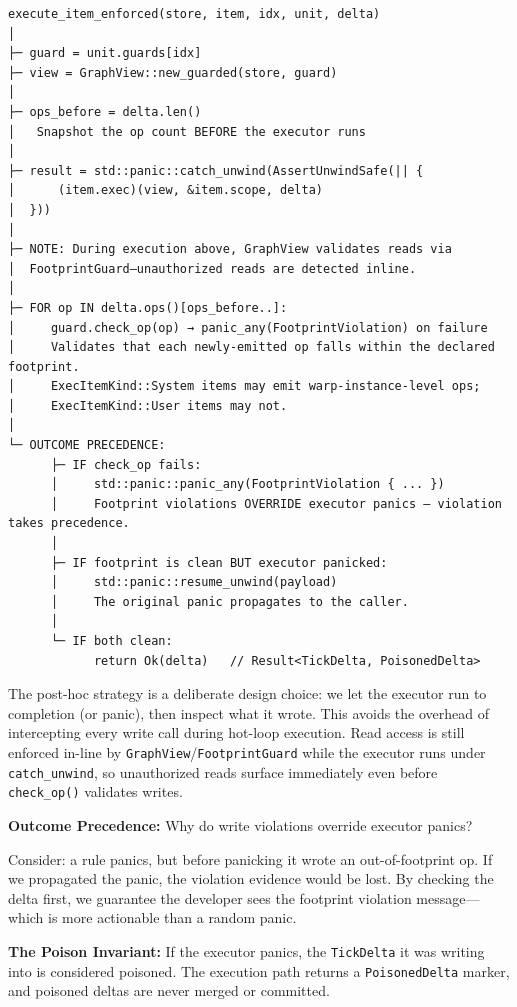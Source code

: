 \documentclass[11pt]{book}
\begin{document}
\begin{verbatim}
execute_item_enforced(store, item, idx, unit, delta)
│
├─ guard = unit.guards[idx]
├─ view = GraphView::new_guarded(store, guard)
│
├─ ops_before = delta.len()
│   Snapshot the op count BEFORE the executor runs
│
├─ result = std::panic::catch_unwind(AssertUnwindSafe(|| {
│      (item.exec)(view, &item.scope, delta)
│  }))
│
├─ NOTE: During execution above, GraphView validates reads via
│  FootprintGuard—unauthorized reads are detected inline.
│
├─ FOR op IN delta.ops()[ops_before..]:
│     guard.check_op(op) → panic_any(FootprintViolation) on failure
│     Validates that each newly-emitted op falls within the declared footprint.
│     ExecItemKind::System items may emit warp-instance-level ops;
│     ExecItemKind::User items may not.
│
└─ OUTCOME PRECEDENCE:
      ├─ IF check_op fails:
      │     std::panic::panic_any(FootprintViolation { ... })
      │     Footprint violations OVERRIDE executor panics — violation takes precedence.
      │
      ├─ IF footprint is clean BUT executor panicked:
      │     std::panic::resume_unwind(payload)
      │     The original panic propagates to the caller.
      │
      └─ IF both clean:
            return Ok(delta)   // Result<TickDelta, PoisonedDelta>
\end{verbatim}

\begin{tourguide}
The post-hoc strategy is a deliberate design choice: we let the executor run to completion (or panic), then inspect what it wrote. This avoids the overhead of intercepting every write call during hot-loop execution. Read access is still enforced in-line by \texttt{GraphView}/\texttt{FootprintGuard} while the executor runs under \texttt{catch\_unwind}, so unauthorized reads surface immediately even before \texttt{check\_op()} validates writes.
\end{tourguide}

\begin{cleverpattern}
\textbf{Outcome Precedence:} Why do write violations override executor panics?

Consider: a rule panics, but before panicking it wrote an out-of-footprint op. If we propagated the panic, the violation evidence would be lost. By checking the delta first, we guarantee the developer sees the footprint violation message—which is more actionable than a random panic.
\end{cleverpattern}

\textbf{The Poison Invariant:} If the executor panics, the \texttt{TickDelta}
it was writing into is considered poisoned. The execution path returns a
\texttt{PoisonedDelta} marker, and poisoned deltas are never merged or
committed.
\end{document}
